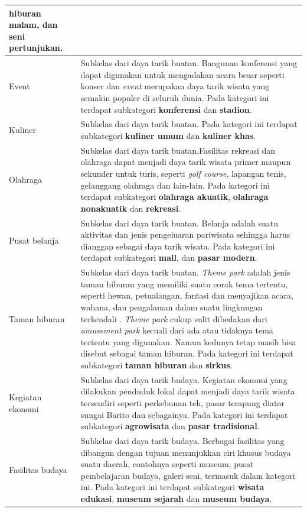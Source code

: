 \begin{center}
\begin{longtable}{ |l|m{10cm}| }
	\textbf{hiburan malam}, dan \textbf{seni pertunjukan}. \\
	\hline
	Event & Subkelas dari daya tarik buatan. Bangunan konferensi yang dapat digunakan untuk mengadakan acara besar seperti konser dan \textit{event}
	merupakan daya tarik wisata yang semakin populer di seluruh dunia. Pada kategori ini terdapat subkategori \textbf{konferensi} dan \textbf{stadion}.\\
	\hline
	Kuliner & Subkelas dari daya tarik buatan. Pada kategori ini terdapat subkategori \textbf{kuliner umum} dan \textbf{kuliner khas}.\\
	\hline
	Olahraga & Subkelas dari daya tarik buatan.Fasilitas rekreasi dan olahraga dapat menjadi daya tarik wisata primer maupun sekunder untuk
	turis, seperti \textit{golf course}, lapangan tenis, gelanggang olahraga dan lain-lain.
	Pada kategori ini terdapat subkategori \textbf{olahraga akuatik}, \textbf{olahraga nonakuatik} dan \textbf{rekreasi}.\\
	\hline
	Pusat belanja & Subkelas dari daya tarik buatan. Belanja adalah suatu aktivitas dan jenis pengeluaran pariwisata sehingga harus dianggap sebagai daya tarik wisata.
	Pada kategori ini terdapat subkategori \textbf{mall}, dan \textbf{pasar modern}.\\
	\hline
	Taman hiburan & Subkelas dari daya tarik buatan. \textit{Theme park} adalah jenis taman hiburan yang memiliki suatu corak tema tertentu, seperti
	hewan, petualangan, fantasi dan menyajikan acara, wahana, dan pengalaman dalam suatu lingkungan terkendali \cite{inskeep1991tourism}.
	\textit{Theme park} cukup sulit dibedakan dari \textit{amusement park} kecuali dari ada atau tidaknya tema tertentu yang digunakan. Namun
	kedunya tetap masih bisa disebut sebagai taman hiburan.
	Pada kategori ini terdapat subkategori \textbf{taman hiburan} dan \textbf{sirkus}.\\
	\hline
	Kegiatan ekonomi & Subkelas dari daya tarik budaya. Kegiatan ekonomi yang dilakukan penduduk lokal dapat menjadi daya tarik wisata tersendiri seperti perkebunan teh, 
	pasar terapung diatar sungai Barito dan sebagainya.
	Pada kategori ini terdapat subkategori \textbf{agrowisata} dan \textbf{pasar tradisional}.\\
	\hline
	Fasilitas budaya & Subkelas dari daya tarik budaya. Berbagai fasilitas yang dibangun dengan tujuan menunjukkan ciri khusus budaya suatu daerah,
	contohnya seperti museum, pusat pembelajaran budaya, galeri seni, termasuk dalam kategori ini.
	Pada kategori ini terdapat subkategori \textbf{wisata edukasi}, \textbf{museum sejarah} dan \textbf{museum budaya}.\\

\end{longtable}
\end{center}

